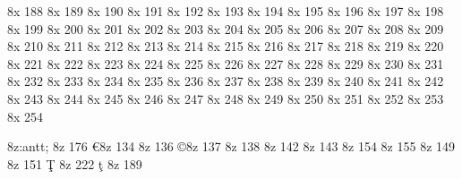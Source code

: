 \characterdef \arrowlefttophalf   8x   188
\characterdef \arrowrighttophalf   8x   189
\characterdef \arrowleftbothalf   8x   190
\characterdef \arrowrightbothalf   8x   191
\characterdef \similar   8x   192
\characterdef \asymptoticallyequal   8x   193
\characterdef \union   8x   194
\characterdef \intersection   8x   195
\characterdef \unionmulti   8x   196
\characterdef \unionsq   8x   197
\characterdef \intersectionsq   8x   198
\characterdef \subsetsqequal   8x   199
\characterdef \supersetsqequal   8x   200
\characterdef \openbullet   8x   201
\characterdef \circleminus   8x   202
\characterdef \circleplus   8x   203
\characterdef \circledivide   8x   204
\characterdef \circlemultiply   8x   205
\characterdef \circledot   8x   206
\characterdef \circlecopyrt   8x   207
\characterdef \diamondmath   8x   208
\characterdef \asteriskmath   8x   209
\characterdef \latticetop   8x   210
\characterdef \perpendicular   8x   211
\characterdef \turnstileleft   8x   212
\characterdef \turnstileright   8x   213
\characterdef \floorleft   8x   214
\characterdef \floorright   8x   215
\characterdef \ceilingleft   8x   216
\characterdef \ceilingright   8x   217
\characterdef \textlangle   8x   218
\characterdef \textrangle   8x   219
\characterdef \dblverticalbar   8x   220
\characterdef \arrowupdndbl   8x   221
\characterdef \arrowupdn   8x   222
\characterdef \universal   8x   223
\characterdef \existential   8x   224
\characterdef \wreathproduct   8x   225
\characterdef \club   8x   226
\characterdef \spade   8x   227
\characterdef \heart   8x   228
\characterdef \diamond   8x   229
\characterdef \logicaland   8x   230
\characterdef \logicalor   8x   231
\characterdef \triangle   8x   232
\characterdef \triangleinv   8x   233
\characterdef \triangleright   8x   234
\characterdef \triangleleft   8x   235
\characterdef \proportional   8x   236
\characterdef \arrowhookleft   8x   237
\characterdef \arrowhookright   8x   238
\characterdef \flat   8x   239
\characterdef \vector   8x   240
\characterdef \tie   8x   241
\characterdef \nabla   8x   242
\characterdef \dollarinferior   8x   243
\characterdef \euroinferior   8x   244
\characterdef \sterlinginferior   8x   245
\characterdef \yeninferior   8x   246
\characterdef \centinferior   8x   247
\characterdef \parenleftinferior   8x   248
\characterdef \periodinferior   8x   249
\characterdef \hypheninferior   8x   250
\characterdef \commainferior   8x   251
\characterdef \parenrightinferior   8x   252
\characterdef \trademark   8x   253
\characterdef \estimated   8x   254

\modifydef 8z:antt; {%
   \characterdef \degree      8z  176
   \characterdef \euro        8z  134
   \characterdef \trademark   8z  136
   \characterdef \copyright   8z  137
   \characterdef \registered  8z  138
   \characterdef \flq         8z  142
   \characterdef \frq         8z  143
   \characterdef \clq         8z  154
   \characterdef \crq         8z  155
   \characterdef \longs       8z  149
   \characterdef \florin      8z  151
   \accentdel  \c T      8z  222
   \accentdel  \c t      8z  189   
}








